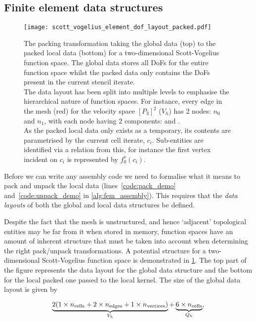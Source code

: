 \documentclass[thesis]{subfiles}
\begin{document}
\subsection{Finite element data structures}

\begin{figure}
  \centering
  \texttt{[image: scott\_vogelius\_element\_dof\_layout\_packed.pdf]}
  \caption{
    The packing transformation taking the global data (top) to the packed local data (bottom) for a two-dimensional Scott-Vogelius function space.
    The global data stores all DoFs for the entire function space whilst the packed data only contains the DoFs present in the current stencil iterate.
    \\
    The data layout has been split into multiple levels to emphasise the hierarchical nature of function spaces.
    For instance, every edge in the mesh (red) for the velocity space $[P_3]^2$ ($V_h$) has 2 nodes: $n_0$ and $n_1$, with each node having 2 components:  and .
    \\
    As the packed local data only exists as a temporary, its contents are parametrised by the current cell iterate, $c_i$.
    Sub-entities are identified via a relation from this, for instance the first vertex incident on $c_i$ is represented by $f_0^v(c_i)$.
  }
  \label{fig:scott_vogelius_element_dof_layout_packed}
\end{figure}

Before we can write any assembly code we need to formalise what it means to pack and unpack the local data (lines~\ref{code:pack_demo} and~\ref{code:unpack_demo} in \cref{alg:fem_assembly}).
This requires that the \textit{data layouts} of both the global and local data structures be defined.

Despite the fact that the mesh is unstructured, and hence `adjacent' topological entities may be far from it when stored in memory, function spaces have an amount of inherent structure that must be taken into account when determining the right pack/unpack transformations.
A potential structure for a two-dimensional Scott-Vogelius function space is demonstrated in \cref{fig:scott_vogelius_element_dof_layout_packed}.
The top part of the figure represents the data layout for the global data structure and the bottom for the local packed one passed to the local kernel.
The size of the global data layout is given by

\begin{equation*}
  \underbrace{2 ( 1 \times n_\textnormal{cells} + 2 \times n_\textnormal{edges} + 1 \times n_\textnormal{vertices} )}_{V_h} + \underbrace{6 \times n_\textnormal{cells}}_{Q_h},
\end{equation*}
\end{document}
